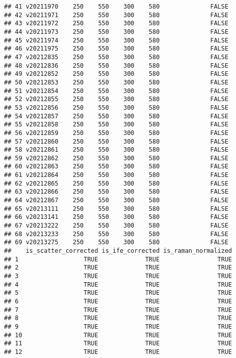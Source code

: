 \documentclass[
]{article}
\begin{document}
\begin{verbatim}
## 41 v20211970    250    550    300    580              FALSE
## 42 v20211971    250    550    300    580              FALSE
## 43 v20211972    250    550    300    580              FALSE
## 44 v20211973    250    550    300    580              FALSE
## 45 v20211974    250    550    300    580              FALSE
## 46 v20211975    250    550    300    580              FALSE
## 47 v20212835    250    550    300    580              FALSE
## 48 v20212836    250    550    300    580              FALSE
## 49 v20212852    250    550    300    580              FALSE
## 50 v20212853    250    550    300    580              FALSE
## 51 v20212854    250    550    300    580              FALSE
## 52 v20212855    250    550    300    580              FALSE
## 53 v20212856    250    550    300    580              FALSE
## 54 v20212857    250    550    300    580              FALSE
## 55 v20212858    250    550    300    580              FALSE
## 56 v20212859    250    550    300    580              FALSE
## 57 v20212860    250    550    300    580              FALSE
## 58 v20212861    250    550    300    580              FALSE
## 59 v20212862    250    550    300    580              FALSE
## 60 v20212863    250    550    300    580              FALSE
## 61 v20212864    250    550    300    580              FALSE
## 62 v20212865    250    550    300    580              FALSE
## 63 v20212866    250    550    300    580              FALSE
## 64 v20212867    250    550    300    580              FALSE
## 65 v20213111    250    550    300    580              FALSE
## 66 v20213141    250    550    300    580              FALSE
## 67 v20213222    250    550    300    580              FALSE
## 68 v20213233    250    550    300    580              FALSE
## 69 v20213275    250    550    300    580              FALSE
##    is_scatter_corrected is_ife_corrected is_raman_normalized
## 1                  TRUE             TRUE                TRUE
## 2                  TRUE             TRUE                TRUE
## 3                  TRUE             TRUE                TRUE
## 4                  TRUE             TRUE                TRUE
## 5                  TRUE             TRUE                TRUE
## 6                  TRUE             TRUE                TRUE
## 7                  TRUE             TRUE                TRUE
## 8                  TRUE             TRUE                TRUE
## 9                  TRUE             TRUE                TRUE
## 10                 TRUE             TRUE                TRUE
## 11                 TRUE             TRUE                TRUE
## 12                 TRUE             TRUE                TRUE

\end{verbatim}
\end{document}
